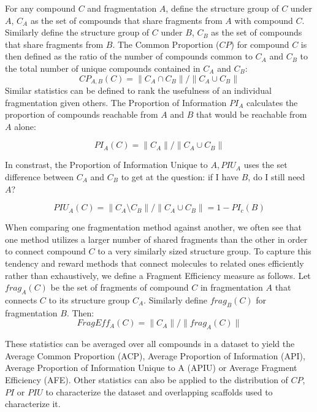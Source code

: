 \documentclass[journal=jacsat,manuscript=article]{achemso}
\begin{document}
For any compound $C$ and fragmentation $A$, define the structure group of
$C$ under $A$, $C_A$ as the set of compounds that share fragments from
$A$ with compound $C$. Similarly define the structure group of $C$
under $B$, $C_B$ as the set of compounds that share fragments from
$B$. The Common Proportion ($CP$) for compound $C$ is then defined as
the ratio of the number of compounds common to $C_A$ and $C_B$ to the
total number of unique compounds contained in $C_A$ and $C_B$:
\begin{equation}
CP_{A,B}(C) = \| C_A \cap C_B \| / \| C_A \cup C_B \|
\end{equation}
Similar statistics can be defined to rank the usefulness of an
individual fragmentation given others. The Proportion of Information
$PI_A$ calculates the proportion of compounds reachable from $A$ and
$B$ that would be reachable from $A$ alone:

\begin{equation}
PI_A(C) = \| C_A \| / \| C_A \cup C_B \|
\end{equation}

In constrast, the Proportion of Information Unique to $A, PIU_A$ uses the set difference between $C_A$ and $C_B$ to get at the question: if I have $B$, do I still need $A$? 

\begin{equation}
 PIU_A(C) = \| C_A \setminus C_B \| / \| C_A \cup C_B \| = 1 - PI_c(B)
 \end{equation}
  
 When comparing one fragmentation method against another, we often see
 that one method utilizes a larger number of shared fragments than the
 other in order to connect compound $C$ to a very similarly sized
 structure group. To capture this tendency and reward methods that
 connect molecules to related ones efficiently rather than
 exhaustively, we define a Fragment Efficiency measure as follows. Let
 $frag_A(C)$ be the set of fragments of compound $C$ in fragmentation
 $A$ that connects $C$ to its structure group $C_A$. Similarly define
 $frag_B(C)$ for fragmentation $B$. Then:
\begin{equation}
FragEff_A(C) = \| C_A \| / \| frag_A(C) \|
\end{equation}


These statistics can be averaged over all compounds in a dataset to
yield the Average Common Proportion (ACP), Average Proportion of
Information (API), Average Proportion of Information Unique to A
(APIU) or Average Fragment Efficiency (AFE).  Other statistics can
also be applied to the distribution of $CP$, $PI$ or $PIU$ to
characterize the dataset and overlapping scaffolds used to
characterize it.
\end{document}
